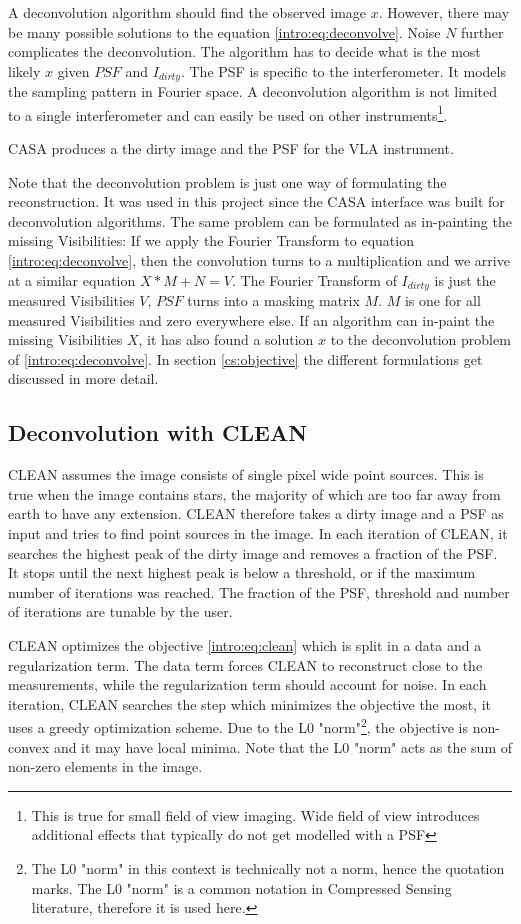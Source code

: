 A deconvolution algorithm should find the observed image $x$. However, there may be many possible solutions to the equation \eqref{intro:eq:deconvolve}. Noise $N$ further complicates the deconvolution. The algorithm has to decide what is the most likely $x$ given $PSF$ and $I_{dirty}$. The PSF is specific to the interferometer. It models the sampling pattern in Fourier space. A deconvolution algorithm is not limited to a single interferometer and can easily be used on other instruments\footnote{This is true for small field of view imaging. Wide field of view introduces additional effects that typically do not get modelled with a PSF}.

CASA produces a the dirty image and the PSF for the VLA instrument.

Note that the deconvolution problem is just one way of formulating the reconstruction. It was used in this project since the CASA interface was built for deconvolution algorithms. The same problem can be formulated as in-painting the missing Visibilities: If we apply the Fourier Transform to equation \eqref{intro:eq:deconvolve}, then the convolution turns to a multiplication and we arrive at a similar equation $X*M + N = V$. The Fourier Transform of $I_{dirty}$ is just the measured Visibilities $V$,  $PSF$ turns into a masking matrix $M$. $M$ is one for all measured Visibilities and zero everywhere else. If an algorithm can in-paint the missing Visibilities $X$, it has also found a solution $x$ to the deconvolution problem of \eqref{intro:eq:deconvolve}. In section \ref{cs:objective} the different formulations get discussed in more detail.


\subsection{Deconvolution with CLEAN}
CLEAN assumes the image consists of single pixel wide point sources. This is true when the image contains stars, the majority of which are too far away from earth to have any extension. CLEAN therefore takes a dirty image and a PSF as input and tries to find point sources in the image. In each iteration of CLEAN, it searches the highest peak of the dirty image and removes a fraction of the PSF. It stops until the next highest peak is below a threshold, or if the maximum number of iterations was reached. The fraction of the PSF, threshold and number of iterations are tunable by the user. 

CLEAN optimizes the objective \eqref{intro:eq:clean} which is split in a data and a regularization term. The data term forces CLEAN to reconstruct close to the measurements, while the regularization term should account for noise. In each iteration, CLEAN searches the step which minimizes the objective the most, it uses a greedy optimization scheme. Due to the L0 "norm"\footnote{The L0 "norm" in this context is technically not a norm, hence the quotation marks. The L0 "norm" is a common notation in Compressed Sensing literature, therefore it is used here.}, the objective is non-convex and it may have local minima. Note that the L0 "norm" acts as the sum of non-zero elements in the image.

